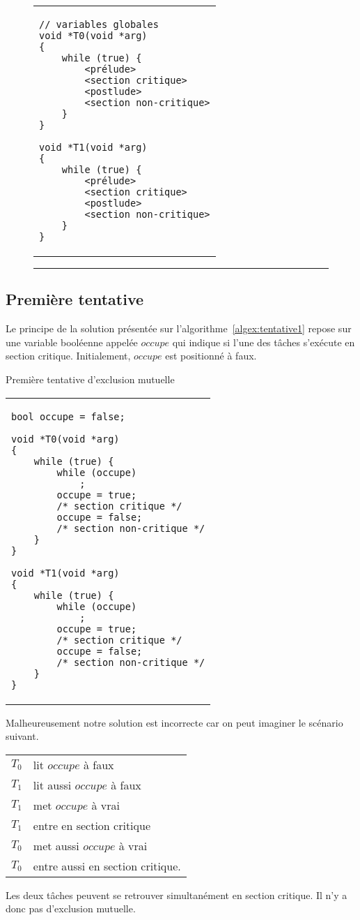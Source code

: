 \begin{figure}[!ht]
\begin{center}
\begin{tabular}{l}
\lstset{language=C++}
\begin{lstlisting}
// variables globales
void *T0(void *arg)
{
	while (true) {
		<prélude>
		<section critique>
		<postlude>
		<section non-critique>
	}
}

void *T1(void *arg)
{
	while (true) {
		<prélude>
		<section critique>
		<postlude>
		<section non-critique>
	}
}
\end{lstlisting}
\end{tabular}
\end{center}
\vspace{-.2cm}
\rule{\textwidth}{0.01in}
\end{figure}

\subsection*{Première tentative}
Le principe de la solution présentée sur l'algorithme~\ref{algex:tentative1} repose sur une variable booléenne appelée $occupe$ qui indique si l'une des tâches s'exécute en section critique.
Initialement, $occupe$ est positionné à faux.

\begin{algorithm}[!ht]
\caption{Première tentative d'exclusion mutuelle}\label{algex:tentative1}
\begin{center}
\begin{tabular}{l}
\lstset{language=C++}
\begin{lstlisting}
bool occupe = false;

void *T0(void *arg)
{
	while (true) {
		while (occupe)
			;
		occupe = true;
		/* section critique */
		occupe = false;
		/* section non-critique */
	}
}

void *T1(void *arg)
{
	while (true) {
		while (occupe)
			;
		occupe = true;
		/* section critique */
		occupe = false;
		/* section non-critique */
	}
}
\end{lstlisting}
\end{tabular}
\end{center}
\end{algorithm}

Malheureusement notre solution est incorrecte car on peut imaginer le scénario suivant.
\begin{center}
\begin{tabular}{cl}
$T_0$& lit $occupe$ à faux \\
$T_1$& lit aussi $occupe$ à faux \\
$T_1$& met $occupe$ à vrai \\
$T_1$& entre en section critique \\
$T_0$& met aussi $occupe$ à vrai \\
$T_0$& entre aussi en section critique. \\
\end{tabular}
\end{center}
Les deux tâches peuvent se retrouver simultanément en section critique.  Il n'y a donc pas d'exclusion mutuelle.

